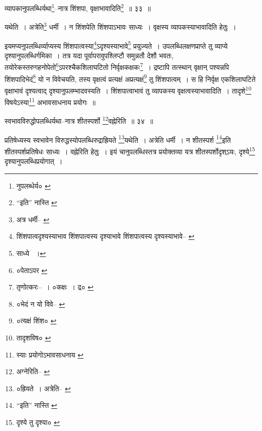 \documentclass[article,12pt,a4paper]{memoir}
\begin{document}
	  \bigskip
	  \begingroup
	

	  \pstart व्यापकानुपलब्धिर्यथा\footnote{नुपलब्धेर्य० \cite{dp-msC}}\---नात्र शिंशपा, वृक्षाभावादिति\footnote{“इति” नास्ति \cite{dp-edE}} ॥ ३३ ॥
	\pend
      
	  \endgroup
	 

	  \pstart यथेति । अत्रेति\footnote{अत्र धर्मी--\cite{dp-msA} \cite{dp-msB} \cite{dp-edP} \cite{dp-edH} \cite{dp-edE}} धर्मी । न शिंशपेति शिंशपाऽभावः साध्यः । वृक्षस्य व्यापकस्याभावादिति हेतुः ।
	\pend
       

	  \pstart इयमप्यनुपलब्धिर्व्याप्यस्य शिंशपात्वस्या\footnote{शिंशपात्वदृश्यस्याभाव \cite{dp-msB} शिंशपात्वस्य दृश्याभावे \cite{dp-msA} \cite{dp-edP} \cite{dp-edH} \cite{dp-edE} \cite{dp-edN} शिंशपात्वस्य दृश्यस्याभावे--\cite{dp-msC} \cite{dp-msD}}\-ऽदृश्यस्याभावे\footnote{साध्ये \cite{dp-msD-n} ।} प्रयुज्यते । उपलब्धिलक्षणप्राप्ते तु व्याप्ये दृश्यानुपलब्धिर्गमिका । तत्र यदा पूर्वापरावुपश्लिप्टौ समुन्नतौ देशौ भवतः, तयोरेकस्तरुगहनोपेतो\footnote{०पेताऽपर \cite{dp-msC}}\-ऽपरश्चैकशिलाघटितो निर्वृक्षकक्षकः\footnote{तृणोत्करः--\cite{dp-msD-n} । ०कक्षः । द्र० \cite{dp-msA} \cite{dp-msB} \cite{dp-msC} \cite{dp-msD} \cite{dp-edP} \cite{dp-edH} \cite{dp-edE} \cite{dp-edN}} । द्रष्टापि तत्स्थान् वृक्षान् पश्यन्नपि शिंशपादिभेदं\footnote{०भेदं न यो विवे--\cite{dp-msA} \cite{dp-edP} \cite{dp-edH} \cite{dp-edE}} यो न विवेचयति, तस्य वृक्षत्वं प्रत्यक्षं अप्रत्यक्षं\footnote{०त्यक्षं शिंश० \cite{dp-msA} \cite{dp-msB} \cite{dp-msC} \cite{dp-edH} \cite{dp-edE} \cite{dp-edN}} तु शिंशपात्वम् । स हि निर्वृक्ष एकशिलाघटिते वृक्षाभावं दृश्यत्वाद् दृश्यानुपलम्भादवस्यति । शिंशपात्वाभावं तु व्यापकस्य वृक्षत्वस्याभावादिति । तादृशे\footnote{तादृशविष० \cite{dp-msA}} विषयेऽस्या\footnote{स्याः प्रयोगोऽभावसाधनाय \cite{dp-msC}} अभावसाधनाय प्रयोगः ॥
	\pend
       
	  \bigskip
	  \begingroup
	

	  \pstart स्वभावविरुद्धोपलब्धिर्यथा--नात्र शीतस्पर्शो \footnote{अग्नेरिति--\cite{dp-msB} \cite{dp-edP} \cite{dp-edH} \cite{dp-edE} \cite{dp-edN}}\-वह्नेरिति ॥ ३४ ॥
	\pend
      
	  \endgroup
	 

	  \pstart प्रतिषेध्यस्य स्वभावेन विरुद्धस्योपलब्धिरुद्राह्रियते \footnote{०ह्रियते । अत्रेति--\cite{dp-msB} \cite{dp-msC} \cite{dp-msD}}\-यथेति । अत्रेति धर्मी । न शीतस्पर्श \footnote{“इति” नास्ति \cite{dp-msA}}\-इति शीतस्पर्शप्रतिषेधः साध्यः । वह्नेरिति हेतुः । इयं चानुपलब्धिस्तत्र प्रयोक्तव्या यत्र शीतस्पर्शोदृश्ऽयः, दृश्ये\footnote{दृश्ये तु दृश्या० \cite{dp-msB} \cite{dp-msC} \cite{dp-msD}} दृश्यानुपलब्धिप्रयोगात् ।
	\pend
      
\end{document}
